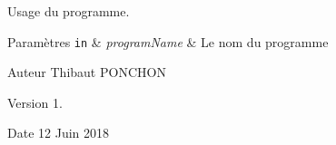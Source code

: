 Usage du programme.
\begin{DoxyParams}[1]{Paramètres}
\mbox{\tt in}  & {\em program\+Name} & Le nom du programme\\
\hline
\end{DoxyParams}
\begin{DoxyAuthor}{Auteur}
Thibaut P\+O\+N\+C\+H\+ON 
\end{DoxyAuthor}
\begin{DoxyVersion}{Version}
1. 
\end{DoxyVersion}
\begin{DoxyDate}{Date}
12 Juin 2018 
\end{DoxyDate}

